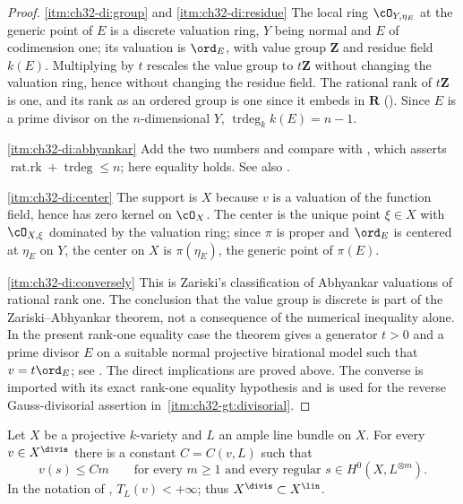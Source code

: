 \begin{proof}
\cref{itm:ch32-di:group} and \cref{itm:ch32-di:residue}  The local ring
$\cO_{Y,\eta_E}$ at the generic point of $E$ is a discrete valuation
ring, $Y$ being normal and $E$ of codimension one; its valuation is
$\ord_E$, with value group $\mathbf Z$ and residue field $k(E)$.
Multiplying by $t$ rescales the value group to $t\mathbf Z$ without
changing the valuation ring, hence without changing the residue field.  The
rational rank of $t\mathbf Z$ is one, and its rank as an ordered group is
one since it embeds in $\mathbf R$
().  Since $E$ is a prime divisor on
the $n$-dimensional $Y$, $\operatorname{trdeg}_kk(E)=n-1$.

\cref{itm:ch32-di:abhyankar}  Add the two numbers and compare with
, which asserts
$\operatorname{rat.rk}+\operatorname{trdeg}\leq n$; here equality holds.
See also .

\cref{itm:ch32-di:center}  The support is $X$ because $v$ is a valuation
of the function field, hence has zero kernel on $\cO_X$.  The center is
the unique point $\xi\in X$ with $\cO_{X,\xi}$ dominated by the valuation
ring; since $\pi$ is proper and $\ord_E$ is centered at $\eta_E$ on
$Y$, the center on $X$ is $\pi(\eta_E)$, the generic point of
$\pi(E)$.

\cref{itm:ch32-di:conversely}  This is Zariski's classification of Abhyankar
valuations of rational rank one.  The conclusion that the value group is
discrete is part of the Zariski--Abhyankar theorem, not a consequence of the
numerical inequality alone.  In the present rank-one equality case the
theorem gives a generator $t>0$ and a prime divisor $E$ on a suitable
normal projective birational model such that $v=t\ord_E$; see
\cite[Ch.~VI, \S14]{ZariskiSamuelII}.  The direct implications are proved above.  The converse is imported
with its exact rank-one equality hypothesis and is used for the reverse
Gauss-divisorial assertion in
\,\cref{itm:ch32-gt:divisorial}.
\end{proof}

\begin{proposition}
\label{prop:ch32-divisorial-linear-growth}
Let $X$ be a projective $k$-variety and $L$ an ample line bundle on
$X$.  For every $v\in X^{\divis}$ there is a constant $C=C(v,L)$ such
that
\[
 v(s)\leq Cm
 \qquad\text{for every }m\geq1\text{ and every regular }
 s\in H^0(X,L^{\otimes m}).
\]
In the notation of , $T_L(v)<+\infty$; thus
$X^{\divis}\subset X^{\lin}$.
\end{proposition}

